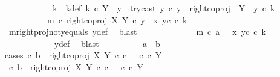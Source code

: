\begin{isabellebody}
\ \ \ \ \ \ \ \ \isamarkupfalse%
\ \isamarkupfalse%
\ k\ \ k{\isacharunderscore}{\kern0pt}def{\isacharcolon}{\kern0pt}\ {\isachardoublequoteopen}k\ {\isasymin}\isactrlsub c\ Y\ {\isasymsetminus}\ {\isacharparenleft}{\kern0pt}{\isasymone}{\isacharcomma}{\kern0pt}y{}{\isacharparenright}{\kern0pt}\ {\isasymand}\ try{\isacharunderscore}{\kern0pt}cast\ y{}\ {\isasymcirc}\isactrlsub c\ y\ {\isacharequal}{\kern0pt}\ right{\isacharunderscore}{\kern0pt}coproj\ {\isasymone}\ {\isacharparenleft}{\kern0pt}Y\ {\isasymsetminus}\ {\isacharparenleft}{\kern0pt}{\isasymone}{\isacharcomma}{\kern0pt}y{}{\isacharparenright}{\kern0pt}{\isacharparenright}{\kern0pt}\ {\isasymcirc}\isactrlsub c\ k\ {\isasymand}\ \isanewline
\ \ \ \ \ \ \ \ \ \ m\ {\isasymcirc}\isactrlsub c\ right{\isacharunderscore}{\kern0pt}coproj\ X\ Y\ {\isasymcirc}\isactrlsub c\ y\ {\isacharequal}{\kern0pt}\ {\isasymlangle}x{}{\isacharcomma}{\kern0pt}\ y{}\isactrlsup c\ {\isasymcirc}\isactrlsub c\ k{\isasymrangle}{\isachardoublequoteclose}\isanewline
\ \ \ \ \ \ \ \ \ \ \isamarkupfalse%
\ m{\isacharunderscore}{\kern0pt}rightproj{\isacharunderscore}{\kern0pt}not{\isacharunderscore}{\kern0pt}y{}{\isacharunderscore}{\kern0pt}equals\ y{\isacharunderscore}{\kern0pt}def\ \isamarkupfalse%
\ blast\ \ \isanewline
\ \ \ \ \ \ \ \ \isamarkupfalse%
\ \isamarkupfalse%
\ {\isachardoublequoteopen}m\ {\isasymcirc}\isactrlsub c\ a\ \ {\isacharequal}{\kern0pt}\ {\isasymlangle}x{}{\isacharcomma}{\kern0pt}\ y{}\isactrlsup c\ {\isasymcirc}\isactrlsub c\ k{\isasymrangle}{\isachardoublequoteclose}\isanewline
\ \ \ \ \ \ \ \ \ \ \isamarkupfalse%
\ y{\isacharunderscore}{\kern0pt}def\ \isamarkupfalse%
\ blast\isanewline
\ \ \ \ \ \ \ \ \isamarkupfalse%
\ {\isachardoublequoteopen}a\ {\isacharequal}{\kern0pt}\ b{\isachardoublequoteclose}\isanewline
\ \ \ \ \ \ \ \ \isamarkupfalse%
{\isacharparenleft}{\kern0pt}cases\ {\isachardoublequoteopen}{\isasymexists}c{\isachardot}{\kern0pt}\ b\ {\isacharequal}{\kern0pt}\ right{\isacharunderscore}{\kern0pt}coproj\ X\ Y\ {\isasymcirc}\isactrlsub c\ c\ \ {\isasymand}\ c\ {\isasymin}\isactrlsub c\ Y{\isachardoublequoteclose}{\isacharparenright}{\kern0pt}\isanewline
\ \ \ \ \ \ \ \ \ \ \isamarkupfalse%
\ {\isachardoublequoteopen}{\isasymexists}c{\isachardot}{\kern0pt}\ b\ {\isacharequal}{\kern0pt}\ right{\isacharunderscore}{\kern0pt}coproj\ X\ Y\ {\isasymcirc}\isactrlsub c\ c\ \ {\isasymand}\ c\ {\isasymin}\isactrlsub c\ Y{\isachardoublequoteclose}\isanewline

\end{isabellebody}
